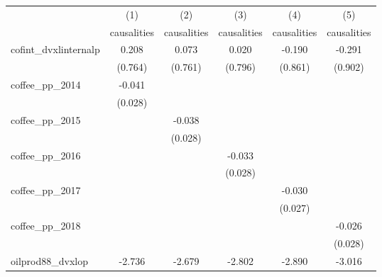 {
\def\sym#1{\ifmmode^{#1}\else\(^{#1}\)\fi}
\begin{tabular}{l*{5}{c}}
\hline\hline
            &\multicolumn{1}{c}{(1)}&\multicolumn{1}{c}{(2)}&\multicolumn{1}{c}{(3)}&\multicolumn{1}{c}{(4)}&\multicolumn{1}{c}{(5)}\\
            &\multicolumn{1}{c}{causalities}&\multicolumn{1}{c}{causalities}&\multicolumn{1}{c}{causalities}&\multicolumn{1}{c}{causalities}&\multicolumn{1}{c}{causalities}\\
\hline
cofint\_dvxlinternalp&       0.208         &       0.073         &       0.020         &      -0.190         &      -0.291         \\
            &     (0.764)         &     (0.761)         &     (0.796)         &     (0.861)         &     (0.902)         \\
[1em]
coffee\_pp\_2014&      -0.041         &                     &                     &                     &                     \\
            &     (0.028)         &                     &                     &                     &                     \\
[1em]
coffee\_pp\_2015&                     &      -0.038         &                     &                     &                     \\
            &                     &     (0.028)         &                     &                     &                     \\
[1em]
coffee\_pp\_2016&                     &                     &      -0.033         &                     &                     \\
            &                     &                     &     (0.028)         &                     &                     \\
[1em]
coffee\_pp\_2017&                     &                     &                     &      -0.030         &                     \\
            &                     &                     &                     &     (0.027)         &                     \\
[1em]
coffee\_pp\_2018&                     &                     &                     &                     &      -0.026         \\
            &                     &                     &                     &                     &     (0.028)         \\
[1em]
oilprod88\_dvxlop&      -2.736         &      -2.679         &      -2.802         &      -2.890         &      -3.016         \\

\end{tabular}}
